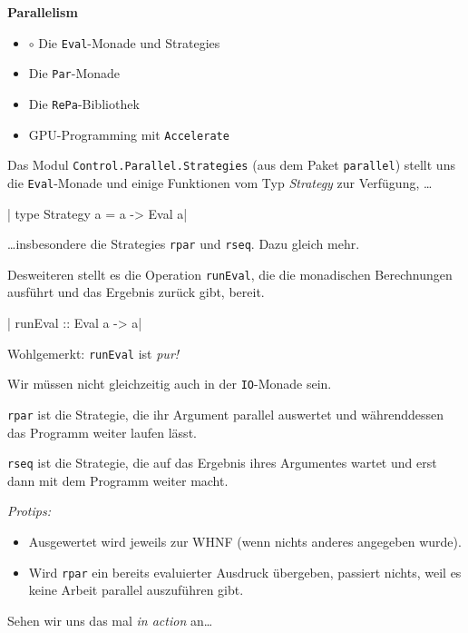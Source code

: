 \documentclass{beamer}
\begin{document}
\begin{frame}[fragile]

\begin{center}
\Large
\textbf{Parallelism}\normalsize\bigskip
\begin{itemize}
\item $\circ$ Die \texttt{Eval}-Monade und Strategies
\item Die \texttt{Par}-Monade
\item Die \texttt{RePa}-Bibliothek
\item GPU-Programming mit \texttt{Accelerate}
\end{itemize}
\end{center}

\end{frame}


\begin{frame}[fragile]

Das Modul \texttt{Control.Parallel.Strategies} (aus dem Paket \texttt{parallel}) stellt uns
die \texttt{Eval}-Monade und einige Funktionen vom Typ \emph{Strategy} zur Verfügung, \dots\pause

|    type Strategy a = a -> Eval a|
\pause

\dots insbesondere die Strategies \texttt{rpar} und \texttt{rseq}. Dazu gleich mehr.\pause\bigskip

Desweiteren stellt es die Operation \texttt{runEval}, die die monadischen 
Berechnungen ausführt und das Ergebnis zurück gibt, bereit.

|    runEval :: Eval a -> a|
\pause
\bigskip

Wohlgemerkt: \texttt{runEval} ist \emph{pur!}

Wir müssen nicht gleichzeitig auch in der \texttt{IO}-Monade sein.

\end{frame}


\begin{frame}[fragile]
\texttt{rpar} ist die Strategie, die ihr Argument parallel auswertet und währenddessen das Programm weiter laufen lässt.
\bigskip\pause

\texttt{rseq} ist die Strategie, die auf das Ergebnis ihres Argumentes wartet und erst dann mit dem Programm weiter macht.
\bigskip\pause

\emph{Protips:}\pause
\begin{itemize}
\item Ausgewertet wird jeweils zur WHNF (wenn nichts anderes angegeben wurde).\pause
\item Wird \texttt{rpar} ein bereits evaluierter Ausdruck übergeben, passiert nichts,
weil es keine Arbeit parallel auszuführen gibt. \pause
\end{itemize}
\bigskip

Sehen wir uns das mal \emph{in action} an\dots
\end{frame}
\end{document}
